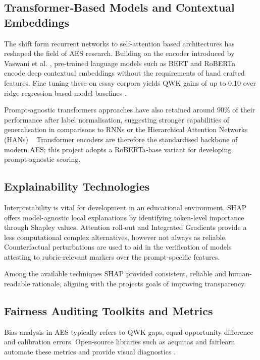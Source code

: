 \documentclass[10pt]{report}
\begin{document}
\subsection{Transformer‑Based Models and Contextual Embeddings}
The shift form recurrent networks to self-attention based architectures has reshaped the field of AES research. Building on the encoder introduced by Vaswani et al. \parencite{vaswani2017attention}, pre-trained language models such as BERT \parencite{devlin2019bert} and RoBERTa \parencite{liu2019roberta} encode deep contextual embeddings without the requirements of hand crafted features. Fine tuning these on essay corpora yields QWK gains of up to 0.10 over ridge-regression based model baselines \parencite{taghipour2016neural}.

Prompt-agnostic transformers approaches have also retained around 90\% of their performance after label normalisation, suggesting stronger capabilities of generalisation in comparisons to RNNs or the Hierarchical Attention Networks (HANs)
 
Transformer encoders are therefore the standardised backbone of modern AES; this project adopts a RoBERTa‑base variant for developing prompt‑agnostic scoring.

\subsection{Explainability Technologies}
Interpretability is vital for development in an educational environment. SHAP \parencite{lundberg2017unified} offers model-agnostic local explanations by identifying token-level importance through Shapley values. Attention roll-out and Integrated Gradients provide a less computational complex alternatives, however not always as reliable. Counterfactual perturbations are used to aid in the verification of models attesting to rubric-relevant markers over the prompt-specific features.

Among the available techniques SHAP provided consistent, reliable and human-readable rationale, aligning with the projects goals of improving transparency.

\subsection{Fairness Auditing Toolkits and Metrics}
Bias analysis in AES typically refers to QWK gaps, equal-opportunity difference and calibration errors. Open-source libraries such as aequitas and fairlearn automate these metrics and  provide visual diagnostics \parencite{litman2024fairness}. 
\end{document}

